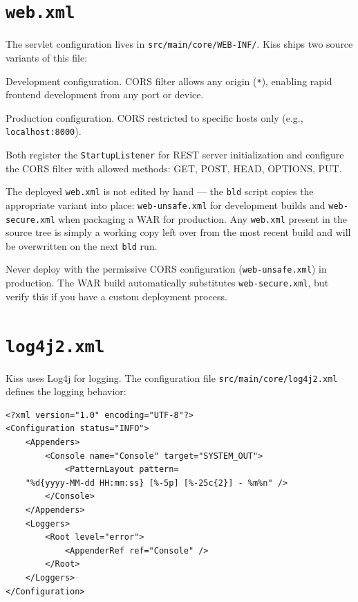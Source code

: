 \section{\texttt{web.xml}}
\label{sec:config-webxml}

The servlet configuration lives in \texttt{src/main/core/WEB-INF/}.  Kiss ships two source variants of this file:

\begin{description}[style=nextline]
  \item[\texttt{web-unsafe.xml}] Development configuration.  CORS filter allows any origin (\texttt{*}), enabling rapid frontend development from any port or device.
  \item[\texttt{web-secure.xml}] Production configuration.  CORS restricted to specific hosts only (e.g., \texttt{localhost:8000}).
\end{description}

\noindent
Both register the \texttt{StartupListener} for REST server initialization and configure the CORS filter with allowed methods: GET, POST, HEAD, OPTIONS, PUT.

The deployed \texttt{web.xml} is not edited by hand --- the \texttt{bld} script copies the appropriate variant into place: \texttt{web-unsafe.xml} for development builds and \texttt{web-secure.xml} when packaging a WAR for production.  Any \texttt{web.xml} present in the source tree is simply a working copy left over from the most recent build and will be overwritten on the next \texttt{bld} run.

\begin{warnbox}
Never deploy with the permissive CORS configuration (\texttt{web-unsafe.xml}) in production.  The WAR build automatically substitutes \texttt{web-secure.xml}, but verify this if you have a custom deployment process.
\end{warnbox}

\section{\texttt{log4j2.xml}}
\label{sec:config-logging}

Kiss uses Log4j for logging.  The configuration file \texttt{src/main/core/\allowbreak{}log4j2.xml} defines the logging behavior:

\begin{lstlisting}[style=html]
<?xml version="1.0" encoding="UTF-8"?>
<Configuration status="INFO">
    <Appenders>
        <Console name="Console" target="SYSTEM_OUT">
            <PatternLayout pattern=
    "%d{yyyy-MM-dd HH:mm:ss} [%-5p] [%-25c{2}] - %m%n" />
        </Console>
    </Appenders>
    <Loggers>
        <Root level="error">
            <AppenderRef ref="Console" />
        </Root>
    </Loggers>
</Configuration>
\end{lstlisting}

